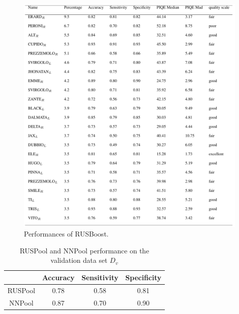 \begin{figure}[h!]
    \centering
    \includegraphics[width = 0.8\linewidth]{images/paper10/RUSBoost performance.png}
    \centering
    \caption{Performances of RUSBoost.}
    \label{fig: RUSBoostPerf}
\end{figure}
\begin{table}[htbp]
    \centering
    \begin{adjustbox}{width=0.7\textwidth}
    \begin{tabular}{|cccc|}
        \hline
        & Accuracy & Sensitivity & Specificity\\
        \hline
        RUSPool & 0.78 & 0.58 & 0.81\\
        NNPool & 0.87 & 0.70 & 0.90\\
        \hline
    \end{tabular}
    \end{adjustbox}
    \caption{RUSPool and NNPool performance on the validation data set $D_v$}
    \label{RUSPoolPerf}
\end{table}

